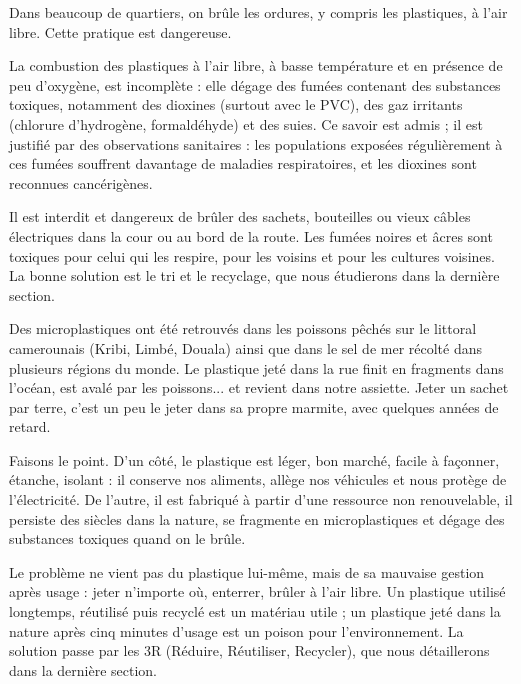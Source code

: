 \documentclass[11pt]{article}
\newcommand{\cle}[1]{{\popxbold\color{popdark}#1}}
\newcounter{popsec}
\newcounter{popsub}
\newcommand{\courssub}[1]{%
  \stepcounter{popsub}%
  \par\vspace{9pt}\noindent{\popxbold\fontsize{11.5}{13}\selectfont\color{popink}{\color{poporange}\thepopsec.\thepopsub}\hspace{6pt}#1}\par\nopagebreak\vspace{4pt}
}
\begin{document}
Dans beaucoup de quartiers, on brûle les ordures, y compris les plastiques, à l'air libre. Cette pratique est dangereuse.

\begin{propriete}
La combustion des plastiques à l'air libre, à basse température et en présence de peu d'oxygène, est incomplète : elle dégage des fumées contenant des \cle{substances toxiques}, notamment des \cle{dioxines} (surtout avec le PVC), des gaz irritants (chlorure d'hydrogène, formaldéhyde) et des suies. Ce savoir est admis ; il est justifié par des observations sanitaires : les populations exposées régulièrement à ces fumées souffrent davantage de maladies respiratoires, et les dioxines sont reconnues cancérigènes.
\end{propriete}

\begin{attention}
Il est interdit et dangereux de brûler des sachets, bouteilles ou vieux câbles électriques dans la cour ou au bord de la route. Les fumées noires et âcres sont toxiques pour celui qui les respire, pour les voisins et pour les cultures voisines. La bonne solution est le tri et le recyclage, que nous étudierons dans la dernière section.
\end{attention}

\begin{savaistu}
Des microplastiques ont été retrouvés dans les poissons pêchés sur le littoral camerounais (Kribi, Limbé, Douala) ainsi que dans le sel de mer récolté dans plusieurs régions du monde. Le plastique jeté dans la rue finit en fragments dans l'océan, est avalé par les poissons... et revient dans notre assiette. Jeter un sachet par terre, c'est un peu le jeter dans sa propre marmite, avec quelques années de retard.
\end{savaistu}

\courssub{Bilan : un bon matériau, une mauvaise gestion}

Faisons le point. D'un côté, le plastique est léger, bon marché, facile à façonner, étanche, isolant : il conserve nos aliments, allège nos véhicules et nous protège de l'électricité. De l'autre, il est fabriqué à partir d'une ressource non renouvelable, il persiste des siècles dans la nature, se fragmente en microplastiques et dégage des substances toxiques quand on le brûle.

\begin{aretenir}
Le problème ne vient pas du plastique lui-même, mais de sa \cle{mauvaise gestion après usage} : jeter n'importe où, enterrer, brûler à l'air libre. Un plastique utilisé longtemps, réutilisé puis recyclé est un matériau utile ; un plastique jeté dans la nature après cinq minutes d'usage est un poison pour l'environnement. La solution passe par les 3R (Réduire, Réutiliser, Recycler), que nous détaillerons dans la dernière section.
\end{aretenir}
\end{document}
